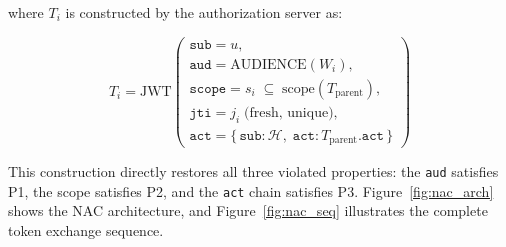 \documentclass[journal]{IEEEtran}
\begin{document}
where $T_i$ is constructed by the authorization server as:

\begin{equation}
T_i = \mathrm{JWT}\!\left(\begin{array}{l}
  \texttt{sub} = u, \\[2pt]
  \texttt{aud} = \mathrm{AUDIENCE}(W_i), \\[2pt]
  \texttt{scope} = s_i \;\subseteq\; \mathrm{scope}(T_{\mathrm{parent}}), \\[2pt]
  \texttt{jti} = j_i \;\text{(fresh, unique)}, \\[2pt]
  \texttt{act} = \{\,\texttt{sub}\text{:}\,\mathcal{H},\;
                    \texttt{act}\text{:}\,T_{\mathrm{parent}}.\texttt{act}\,\}
\end{array}\right)
\label{eq:child}
\end{equation}

This construction directly restores all three violated properties: the
\texttt{aud} satisfies P1, the scope satisfies P2, and the \texttt{act} chain
satisfies P3. Figure~\ref{fig:nac_arch} shows the NAC architecture, and
Figure~\ref{fig:nac_seq} illustrates the complete token exchange sequence.
\end{document}
